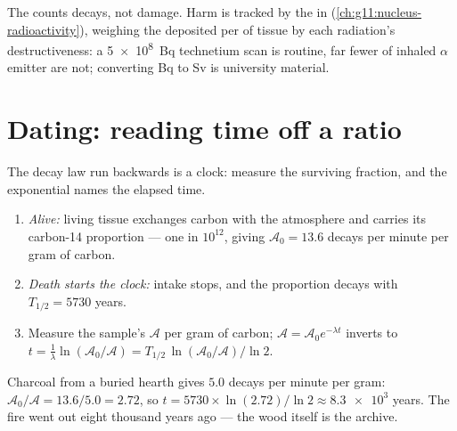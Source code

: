 \begin{remark}\label{rem:g12:radioactive-decay:dose}
The  counts decays, not damage. Harm is tracked by the  in
 (\cref{ch:g11:nucleus-radioactivity}), weighing the 
deposited per  of tissue by each radiation's destructiveness: a
\qty{5e8}{Bq} technetium scan is routine, far fewer  of inhaled
$\alpha$ emitter are not; converting \unit{Bq} to \unit{Sv} is
university material.
\end{remark}

\section{Dating: reading time off a ratio}

The decay law run backwards is a clock: measure the surviving fraction,
and the exponential names the elapsed time.

\begin{method}\label{met:g12:radioactive-decay:carbon}
\begin{enumerate}
  \item \emph{Alive:} living tissue exchanges carbon with the atmosphere
        and carries its carbon-14 proportion --- one  in $10^{12}$,
        giving $\mathcal A_0 = 13.6$ decays per minute per gram of carbon.
  \item \emph{Death starts the clock:} intake stops, and the proportion
        decays with $T_{1/2} = \num{5730}$ years.
  \item Measure the sample's  $\mathcal A$ per gram of carbon;
        $\mathcal A = \mathcal A_0 e^{-\lambda t}$ inverts to
        $t = \frac{1}{\lambda}\ln(\mathcal A_0/\mathcal A)
        = T_{1/2}\,\ln(\mathcal A_0/\mathcal A)/\ln 2$.
\end{enumerate}
\end{method}

\begin{example}\label{ex:g12:radioactive-decay:hearth}
Charcoal from a buried hearth gives $5.0$ decays per minute per gram:
$\mathcal A_0/\mathcal A = 13.6/5.0 = 2.72$, so
$t = \num{5730} \times \ln(2.72)/\ln 2 \approx \num{8.3e3}$ years. The
fire went out eight thousand years ago --- the wood itself is the archive.
\end{example}

